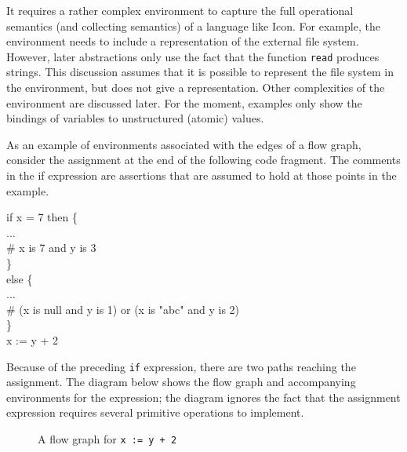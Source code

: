 It requires a rather complex environment to capture the full
operational semantics (and collecting semantics) of a language like
Icon. For example, the environment needs to include a representation
of the external file system.  However, later abstractions only use the
fact that the function \texttt{read} produces strings. This discussion
assumes that it is possible to represent the file system in the
environment, but does not give a representation. Other complexities of
the environment are discussed later. For the moment, examples only
show the bindings of variables to unstructured (atomic) values.

As an example of environments associated with the edges of a flow
graph, consider the assignment at the end of the following code
fragment. The comments in the if expression are assertions that are
assumed to hold at those points in the example.

\goodbreak
\begin{iconcode}
\>if x = 7 then \{\\
\>\>...\\
\>\>\# x is 7 and y is 3\\
\>\>\}\\
\>else \{\\
\>\>...\\
\>\>\# (x is null and y is 1) or (x is "abc" and y is 2)\\
\>\>\}\\
\>x := y + 2\\
\end{iconcode}


Because of the preceding \texttt{if} expression, there are two paths
reaching the assignment. The diagram below shows the flow graph and
accompanying environments for the expression; the diagram ignores the
fact that the assignment expression requires several primitive
operations to implement.



\begin{figure}[htb]
\begin{center}
\end{center}
\caption{A flow graph for \texttt{x := y + 2}}
\end{figure}

